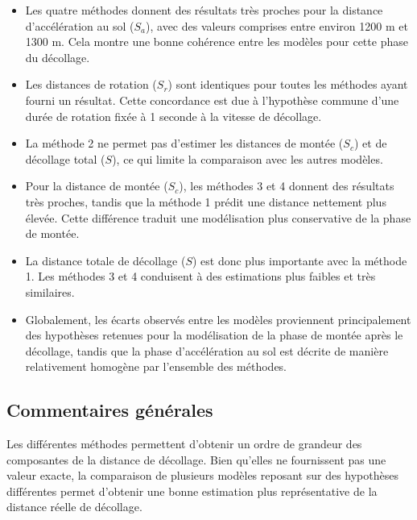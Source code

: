 	\begin{itemize}
		\item Les quatre méthodes donnent des résultats très proches pour la distance
		 d'accélération au sol ($S_a$), avec des valeurs comprises entre environ 1200 m
		  et 1300 m. Cela montre une bonne cohérence entre les modèles pour cette phase du décollage.
		
		\item Les distances de rotation ($S_r$) sont identiques pour toutes les méthodes ayant fourni un résultat. 
			Cette concordance est due à l'hypothèse commune d'une durée de rotation fixée à 1 seconde à la vitesse de décollage.
		
		\item La méthode 2 ne permet pas d'estimer les distances de montée ($S_c$) et de décollage total ($S$), 
			ce qui limite la comparaison avec les autres modèles.
		
		\item Pour la distance de montée ($S_c$), les méthodes 3 et 4 donnent 
			des résultats très proches, tandis que la méthode 1 prédit une distance
		 	nettement plus élevée. Cette différence traduit une modélisation plus 
		 	conservative de la phase de montée.
		
		\item La distance totale de décollage ($S$) est donc plus importante avec la méthode 1.
		 Les méthodes 3 et 4 conduisent à des estimations plus faibles et très similaires.
		
		\item Globalement, les écarts observés entre les modèles proviennent principalement des
		 hypothèses retenues pour la modélisation de la phase de montée après le décollage,
		  tandis que la phase d'accélération au sol est décrite de manière relativement homogène par l'ensemble des méthodes.
	\end{itemize}
	
	
	\subsection{Commentaires générales }
	
	Les différentes méthodes permettent d'obtenir un ordre de grandeur des composantes de la distance de décollage.
	Bien qu'elles ne fournissent pas une valeur exacte, la comparaison de plusieurs modèles reposant sur des hypothèses
	 différentes permet d'obtenir une bonne estimation plus représentative de la distance réelle de décollage.
	
	